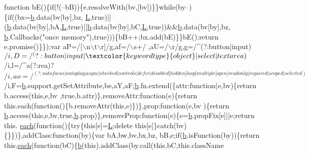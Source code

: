 \begin{DoxyCode}
{      function} bE()\{\textcolor{keywordflow}{if}(!(--bB))\{e.resolveWith(bv,[bv])\}\}\textcolor{keywordflow}{while}(by--)\{\textcolor{keywordflow}{if}((bx=\hyperlink{jquery_8js_aa4026ad5544b958e54ce5e106fa1c805}{b}.data(bv[by],bz,
      \hyperlink{jquery_8js_a38ee4c0b5f4fe2a18d0c783af540d253}{L},\textcolor{keyword}{true})||(\hyperlink{jquery_8js_aa4026ad5544b958e54ce5e106fa1c805}{b}.data(bv[by],bA,\hyperlink{jquery_8js_a38ee4c0b5f4fe2a18d0c783af540d253}{L},\textcolor{keyword}{true})||\hyperlink{jquery_8js_aa4026ad5544b958e54ce5e106fa1c805}{b}.data(bv[by],bC,\hyperlink{jquery_8js_a38ee4c0b5f4fe2a18d0c783af540d253}{L},\textcolor{keyword}{true}))&&\hyperlink{jquery_8js_aa4026ad5544b958e54ce5e106fa1c805}{b}.data(bv[by],bz,
      \hyperlink{jquery_8js_aa4026ad5544b958e54ce5e106fa1c805}{b}.Callbacks(\textcolor{stringliteral}{"once memory"}),\textcolor{keyword}{true})))\{bB++;bx.add(bE)\}\}bE();\textcolor{keywordflow}{return} e.promise()\}\});var aP=/[\(\backslash\)n\(\backslash\)t\(\backslash\)r]/g,af=/\(\backslash\)s+/
      ,aU=/\(\backslash\)r/g,g=/^(?:button|input)$/i,D=/^(?:button|input|\textcolor{keywordtype}{object}|select|textarea)$/i,l=/^a(?:rea)?$/i,ao=/^(?:
      autofocus|autoplay|async|checked|controls|defer|disabled|hidden|loop|multiple|open|readonly|required|scoped|
      selected)$/i,F=\hyperlink{jquery_8js_aa4026ad5544b958e54ce5e106fa1c805}{b}.support.getSetAttribute,be,aY,aF;\hyperlink{jquery_8js_aa4026ad5544b958e54ce5e106fa1c805}{b}.fn.extend(\{attr:function(e,bv)\{return b.access(this,e,bv
      ,true,b.attr)\},removeAttr:\textcolor{keyword}{function}(e)\{return this.each(function()\{b.removeAttr(this,e)\})\},prop:\textcolor{keyword}{function}(e,bv
      )\{\textcolor{keywordflow}{return} \hyperlink{jquery_8js_aa4026ad5544b958e54ce5e106fa1c805}{b}.access(\textcolor{keyword}{this},e,bv,\textcolor{keyword}{true},\hyperlink{jquery_8js_aa4026ad5544b958e54ce5e106fa1c805}{b}.prop)\},removeProp:\textcolor{keyword}{function}(e)\{e=\hyperlink{jquery_8js_aa4026ad5544b958e54ce5e106fa1c805}{b}.propFix[e]||e;\textcolor{keywordflow}{return} this.
      \hyperlink{jquery_8js_a871ff39db627c54c710a3e9909b8234c}{each}(\textcolor{keyword}{function}()\{\textcolor{keywordflow}{try}\{\textcolor{keyword}{this}[e]=\hyperlink{jquery_8js_a38ee4c0b5f4fe2a18d0c783af540d253}{L};\textcolor{keyword}{delete} \textcolor{keyword}{this}[e]\}\textcolor{keywordflow}{catch}(bv)\{\}\})\},addClass:\textcolor{keyword}{function}(by)\{var bA,bw,bv,bx,bz,
      bB,e;\textcolor{keywordflow}{if}(\hyperlink{jquery_8js_aa4026ad5544b958e54ce5e106fa1c805}{b}.isFunction(by))\{\textcolor{keywordflow}{return} this.\hyperlink{jquery_8js_a871ff39db627c54c710a3e9909b8234c}{each}(\textcolor{keyword}{function}(bC)\{\hyperlink{jquery_8js_aa4026ad5544b958e54ce5e106fa1c805}{b}(\textcolor{keyword}{this}).addClass(by.call(\textcolor{keyword}{this},bC,\textcolor{keyword}{this}.className

\end{DoxyCode}
